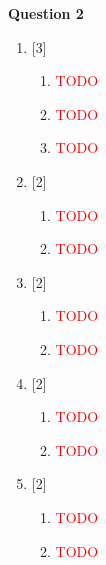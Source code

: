 \newpage
\par
\noindent
\textbf{Question 2}\\
\begin{enumerate}[label=(\roman*)]

    \item \hfill [3]
        \begin{enumerate}[label=(\alph*)]
            \item \textcolor{red}{TODO} 
            \item \textcolor{red}{TODO} 
            \item \textcolor{red}{TODO} 
        \end{enumerate}

    \item \hfill [2]
        \begin{enumerate}[label=(\alph*)]
            \item \textcolor{red}{TODO} 
            \item \textcolor{red}{TODO} 
        \end{enumerate}

    \item \hfill [2]
        \begin{enumerate}[label=(\alph*)]
            \item \textcolor{red}{TODO} 
            \item \textcolor{red}{TODO} 
        \end{enumerate}

    \item \hfill [2]
        \begin{enumerate}[label=(\alph*)]
            \item \textcolor{red}{TODO} 
            \item \textcolor{red}{TODO} 
        \end{enumerate}

    \item \hfill [2]
        \begin{enumerate}[label=(\alph*)]
            \item \textcolor{red}{TODO} 
            \item \textcolor{red}{TODO} 
        \end{enumerate}


\end{enumerate}
